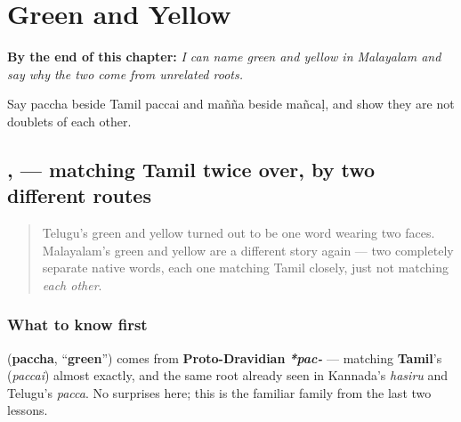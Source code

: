 
\chapter{Green and Yellow}
\label{ch:ml-green-and-yellow}

\begin{chapteropening}
\textbf{By the end of this chapter:} \emph{I can name green and yellow in Malayalam and say why the two come from unrelated roots.}

Say paccha beside Tamil paccai and mañña beside mañcaḷ, and show they are not doublets of each other.
\end{chapteropening}

\section[\texorpdfstring{\ml{പച്ച}, \ml{മഞ്ഞ} (pacca, mañña)}{പച്ച, മഞ്ഞ (pacca, mañña)}]{,  — matching Tamil twice over, by two different routes}

\label{lesson:ML-C22-paccha-manja}



\begin{quote}
Telugu's green and yellow turned out to be one word wearing two faces. Malayalam's green and yellow are a different story again — two completely separate native words, each one matching Tamil closely, just not matching \emph{each other}.
\end{quote}

\subsection*{What to know first}
\textbf{} (\textbf{paccha}, \textquotedblleft{}\textbf{green}\textquotedblright{}) comes from \textbf{Proto-Dravidian} \emph{\textbf{*pac-}} — matching \textbf{Tamil}'s \textbf{} (\emph{paccai}) almost exactly, and the same root already seen in Kannada's \emph{hasiru} and Telugu's \emph{pacca}. No surprises here; this is the familiar family from the last two lessons.


